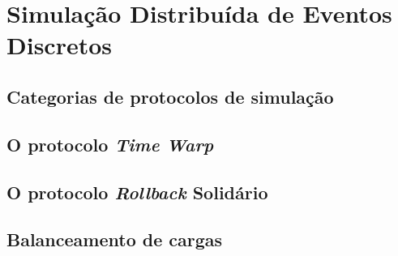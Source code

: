 \chapter{Simulação Distribuída de Eventos Discretos}

\section{Categorias de protocolos de simulação}

\section{O protocolo \textit{Time Warp}}
\section{O protocolo \textit{Rollback} Solidário}
\section{Balanceamento de cargas}

